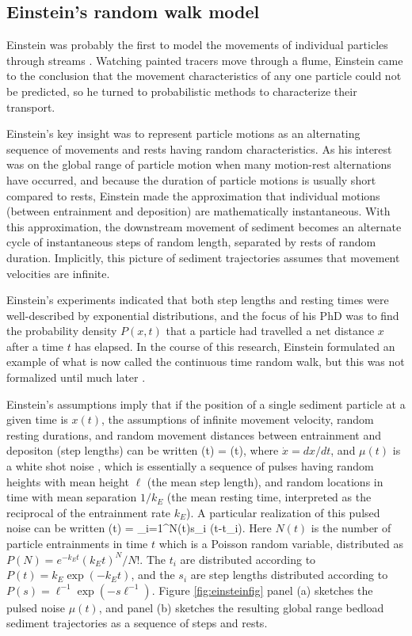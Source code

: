 \subsection{Einstein's random walk model}
\label{sec:einwalk}
Einstein was probably the first to model the movements of individual particles through streams \citep{Einstein1937}.
Watching painted tracers move through a flume, Einstein came to the conclusion that the movement characteristics of any one particle could not be predicted, so he turned to probabilistic methods to characterize their transport.

Einstein's key insight was to represent particle motions as an alternating sequence of movements and rests having random characteristics.
As his interest was on the global range of particle motion when many motion-rest alternations have occurred, and because the duration of particle motions is usually short compared to rests, Einstein made the approximation that individual motions (between entrainment and deposition) are mathematically instantaneous.
With this approximation, the downstream movement of sediment becomes an alternate cycle of instantaneous steps of random length, separated by rests of random duration. 
Implicitly, this picture of sediment trajectories assumes that movement velocities are infinite.

Einstein's experiments indicated that both step lengths and resting times were well-described by exponential distributions, and the focus of his PhD was to find the probability density $P(x,t)$ that a particle had travelled a net distance $x$ after a time $t$ has elapsed. In the course of this research, Einstein formulated an example of what is now called the continuous time random walk, but this was not formalized until much later \citep{Montroll1965}.

Einstein's assumptions imply that if the position of a single sediment particle at a given time is $x(t)$, the assumptions of infinite movement velocity, random resting durations, and random movement distances between entrainment and depositon (step lengths) can be written
\be {}(t) = \mu(t), \label{eq:einlangevin}\ee
where $\dot{x} = dx/dt$, and $\mu(t)$ is a white shot noise \citep{VanDenBroeck1983}, which is essentially a sequence of pulses having random heights with mean height $\ell$ (the mean step length), and random locations in time with mean separation $1/k_E$ (the mean resting time, interpreted as the reciprocal of the entrainment rate $k_E$).
A particular realization of this pulsed noise can be written
\be \mu(t) = \sum_{i=1}^{N(t)}s_i \delta(t-t_i). \label{eq:einrando} \ee
Here $N(t)$ is the number of particle entrainments in time $t$ which is  a Poisson random variable, distributed as $P(N) = e^{-k_E t} (k_E t)^N/N!$.
The $t_i$ are distributed according to $P(t) = k_E\exp(-k_E t)$, and the $s_i$ are step lengths distributed according to $P(s) = \ell^{-1}\exp(-s \ell^{-1}).$
Figure \ref{fig:einsteinfig} panel (a) sketches the pulsed noise $\mu(t)$, and panel (b) sketches the resulting global range bedload sediment trajectories as a sequence of steps and rests.


